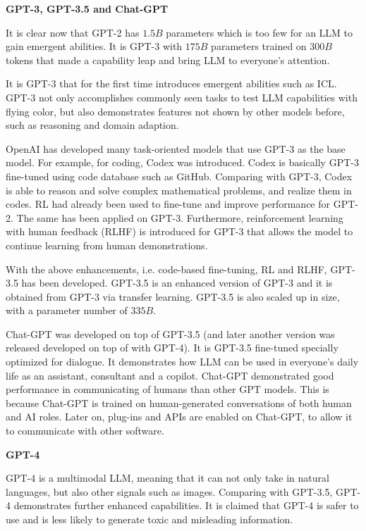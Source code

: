 \vspace{0.1in}
\noindent \textbf{GPT-3, GPT-3.5 and Chat-GPT}
\vspace{0.1in}

It is clear now that GPT-2 has $1.5B$ parameters which is too few for an LLM to gain emergent abilities. It is GPT-3 with $175B$ parameters trained on $300B$ tokens that made a capability leap and bring LLM to everyone's attention.

It is GPT-3 that for the first time introduces emergent abilities such as ICL. GPT-3 not only accomplishes commonly seen tasks to test LLM capabilities with flying color, but also demonstrates features not shown by other models before, such as reasoning and domain adaption.

OpenAI has developed many task-oriented models that use GPT-3 as the base model. For example, for coding, Codex was introduced. Codex is basically GPT-3 fine-tuned using code database such as GitHub. Comparing with GPT-3, Codex is able to reason and solve complex mathematical problems, and realize them in codes. RL had already been used to fine-tune and improve performance for GPT-2. The same has been applied on GPT-3. Furthermore, reinforcement learning with human feedback (RLHF) is introduced for GPT-3 that allows the model to continue learning from human demonstrations.

With the above enhancements, i.e. code-based fine-tuning, RL and RLHF, GPT-3.5 has been developed. GPT-3.5 is an enhanced version of GPT-3 and it is obtained from GPT-3 via transfer learning. GPT-3.5 is also scaled up in size, with a parameter number of $335B$.

Chat-GPT was developed on top of GPT-3.5 (and later another version was released developed on top of with GPT-4). It is GPT-3.5 fine-tuned specially optimized for dialogue. It demonstrates how LLM can be used in everyone's daily life as an assistant, consultant and a copilot. Chat-GPT demonstrated good performance in communicating of humans than other GPT models. This is because Chat-GPT is trained on human-generated conversations of both human and AI roles. Later on, plug-ins and APIs are enabled on Chat-GPT, to allow it to communicate with other software.

\vspace{0.1in}
\noindent \textbf{GPT-4}
\vspace{0.1in}

GPT-4 is a multimodal LLM, meaning that it can not only take in natural languages, but also other signals such as images. Comparing with GPT-3.5, GPT-4 demonstrates further enhanced capabilities. It is claimed that GPT-4 is safer to use and is less likely to generate toxic and misleading information.

